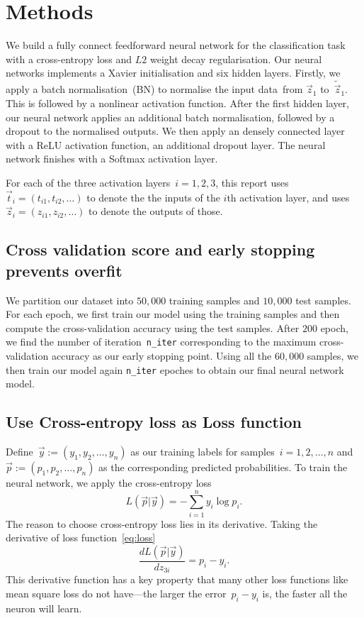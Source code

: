\section{Methods \label{chapter2}}
We build a fully connect feedforward neural network for the classification task with a cross-entropy loss and $L2$ weight decay regularisation. Our neural networks implements a Xavier initialisation and six hidden layers. 
Firstly, we apply a batch normalisation~(BN) to normalise the input data~from $\vec z_1$ to~$\tilde{\vec z}_1$. This is followed by a nonlinear activation function. After the first hidden layer, our neural network applies an additional batch normalisation, followed by a dropout to the normalised outputs. 
We then apply an densely connected layer with a ReLU activation function, an additional dropout layer. The neural network finishes with a Softmax activation layer. 

For each of the three activation layers~$i=1,2,3$, this report uses $\vec t_i=(t_{i1},t_{i2},\ldots)$ to denote the the inputs of the $i$th activation layer, and uses $\vec z_i=(z_{i1},z_{i2},\ldots)$ to denote the outputs of those.

\subsection{Cross validation score and early stopping prevents overfit}
We partition our dataset into $50,000$ training samples and $10,000$ test samples. For each epoch, we first train our model using the training samples and then compute the cross-validation accuracy using the test samples. After $200$ epoch, we find the number of iteration~\texttt{n\_iter} corresponding to the maximum cross-validation accuracy as our early stopping point. Using all the $60,000$ samples, we then train our model again  \texttt{n\_iter} epoches to obtain our final neural network model.

\subsection{Use Cross-entropy loss as Loss function}
Define~$\vec y:=(y_1,y_2,\ldots,y_n)$ as our training labels for samples~$i=1,2,\ldots,n$ and $\vec p:=(p_1,p_2,\ldots,p_n)$ as the corresponding predicted probabilities. To train the neural network, we apply the cross-entropy loss 
\begin{equation}
  {L(\vec p|\vec y)=-\sum _{i=1}^n y_i\log p_i}.  \label{eq:loss}
\end{equation}
The reason to choose cross-entropy loss lies in its derivative. Taking the derivative of loss function~\eqref{eq:loss}
\begin{equation}
  \frac{d L(\vec p|\vec y)}{d z_{3i}}=p_i-y_i.  
\end{equation}
This derivative function has a key property that many other loss functions like mean square loss do not have---the larger the error~$p_i-y_i$ is, the faster all the neuron will learn.

